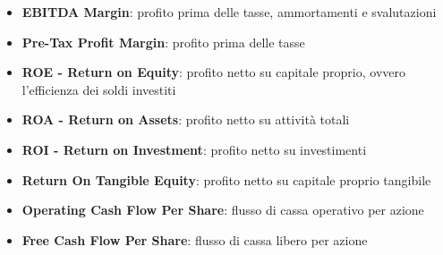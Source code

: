 \begin{itemize}[label=-]
    \item \textbf{EBITDA Margin}: profito prima delle tasse, ammortamenti e svalutazioni
    \item \textbf{Pre-Tax Profit Margin}: profito prima delle tasse
    \item \textbf{ROE - Return on Equity}: profito netto su capitale proprio, ovvero l'efficienza dei soldi investiti
    \item \textbf{ROA - Return on Assets}: profito netto su attività totali
    \item \textbf{ROI - Return on Investment}: profito netto su investimenti
    \item \textbf{Return On Tangible Equity}: profito netto su capitale proprio tangibile
    \item \textbf{Operating Cash Flow Per Share}: flusso di cassa operativo per azione
    \item \textbf{Free Cash Flow Per Share}: flusso di cassa libero per azione
\end{itemize}

